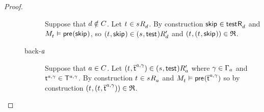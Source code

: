 \begin{proof}
\begin{description}
\begin{description}
                Suppose that $\agentD \notin \agentsC$.
                Let $\kStateT \in \kSuccessorsD{\kStateS}$.
                By construction $\aStateSkip \in \aSuccessorsD{\aStateTest}$ and $\kPModel{\kStateT} \entails \aPrecondition(\aStateSkip)$, so $(\kStateT, \aStateSkip) \in \kSuccessorsPD{(\kStateS, \aStateTest)}$ and $(\kStateT, (\kStateT, \aStateSkip)) \in \refinement$.
            \item[back-$\agentA$]
                Suppose that $\agentA \in \agentsC$.
                Let $(\kStateT, \aPStateT[\agentA, \gamma]) \in \kSuccessorsPA{(\kStateS, \aStateTest)}$ where $\gamma \in \Gamma_\agentA$ and $\aStateT[\agentA, \gamma] \in \aStatesT[\agentA, \gamma]$.
                By construction $\kStateT \in \kSuccessorsA{\kStateS}$ and $\kPModel{\kStateT} \entails \aPrecondition(\aPStateT[\agentA, \gamma])$ so by construction $(\kStateT, (\kStateT, \aPStateT[\agentA, \gamma])) \in \refinement$.


\end{description}
\end{description}
\end{proof}
